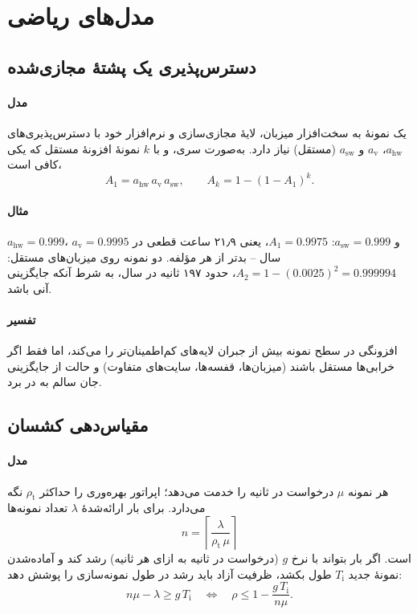 \documentclass[11pt,a4paper]{article}
\begin{document}
\section{مدل‌های ریاضی}

\subsection{دسترس‌پذیری یک پشتهٔ مجازی‌شده}\label{sec:avail}
\paragraph{مدل} یک نمونهٔ  به سخت‌افزار میزبان، لایهٔ مجازی‌سازی و نرم‌افزار خود با دسترس‌پذیری‌های
$a_{\mathrm{hw}}$، $a_{\mathrm{v}}$ و $a_{\mathrm{sw}}$ (مستقل) نیاز دارد. به‌صورت سری، و با $k$ نمونهٔ افزونهٔ مستقل که یکی
کافی است،
\begin{equation}\label{eq:series}
  A_1 = a_{\mathrm{hw}}\,a_{\mathrm{v}}\,a_{\mathrm{sw}}, \qquad
  A_{k} = 1-(1-A_1)^{k}.
\end{equation}
\paragraph{مثال} $a_{\mathrm{hw}} = 0.999$، $a_{\mathrm{v}} = 0.9995$ و $a_{\mathrm{sw}} = 0.999$: $A_1 = 0.9975$، یعنی ۲۱٫۹ ساعت
قطعی در سال -- بدتر از هر مؤلفه. دو نمونه روی میزبان‌های مستقل: $A_2 = 1 - (0.0025)^2 = 0.999994$، حدود ۱۹۷ ثانیه در سال، به
شرط آنکه جایگزینی آنی باشد.
\paragraph{تفسیر} افزونگی در سطح نمونه بیش از جبران لایه‌های کم‌اطمینان‌تر را می‌کند، اما فقط اگر خرابی‌ها مستقل باشند
(میزبان‌ها، قفسه‌ها، سایت‌های متفاوت) و حالت از جایگزینی جان سالم به در برد.

\subsection{مقیاس‌دهی کشسان}\label{sec:scale}
\paragraph{مدل} هر نمونه $\mu$ درخواست در ثانیه را خدمت می‌دهد؛ اپراتور بهره‌وری را حداکثر $\rho_{\mathrm{t}}$ نگه می‌دارد. برای
بار ارائه‌شدهٔ $\lambda$ تعداد نمونه‌ها
\begin{equation}\label{eq:scale}
  n = \left\lceil \frac{\lambda}{\rho_{\mathrm{t}}\,\mu} \right\rceil
\end{equation}
است. اگر بار بتواند با نرخ $g$ (درخواست در ثانیه به ازای هر ثانیه) رشد کند و آماده‌شدن نمونهٔ جدید $T_\mathrm{i}$ طول بکشد،
ظرفیت آزاد باید رشد در طول نمونه‌سازی را پوشش دهد:
\begin{equation}\label{eq:headroom}
  n\mu - \lambda \ge g\,T_\mathrm{i}
  \quad\Longleftrightarrow\quad
  \rho \le 1 - \frac{g\,T_\mathrm{i}}{n\mu}.
\end{equation}
\end{document}
